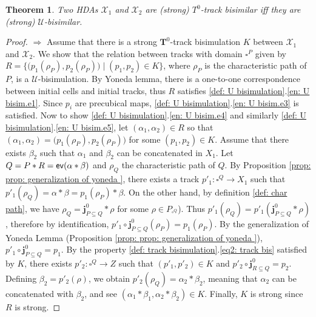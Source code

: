 \documentclass[11pt,a4paper,oldfontcommands]{memoir}
\newcommand*\ev{\textup{\textsf{ev}}}
\newcommand{\TrO}{\mathbf{T}}
\newcommand*\pobj[1]{\square^{#1}}
\newcommand*\jneda{\mathbf{j}}
\newtheorem{theorem}[definition]{Theorem}
\begin{document}
\begin{theorem}
   Two HDAs $\mathcal{X}_1$ and $\mathcal{X}_2$ are (strong) $T^0$-track bisimilar iff they are (strong) $\mathcal{U}$-bisimilar.
\end{theorem}
\begin{proof}
    $\Rightarrow$ Assume that there is a strong $\TrO^0$-track bisimulation $K$ between $\mathcal{X}_1$ and $\mathcal{X}_2$. We show that the relation between tracks with domain $\square^P$ given by $R=\{\bigl(p_1(\rho_P),p_2(\rho_P)\bigl) \mid (p_1,p_2)\in K\}$, where $\rho_P$ is the characteristic path of $P$, is a $\mathcal{U}$-bisimulation. By Yoneda lemma, there is a one-to-one correspondence between initial cells and initial tracks, thus $R$ satisfies \ref{def: U bisimulation}.\ref{en: U bisim.e1}. Since $p_i$ are precubical maps, \ref{def: U bisimulation}.\ref{en: U bisim.e3} is satisfied. Now to show \ref{def: U bisimulation}.\ref{en: U bisim.e4} and similarly \ref{def: U bisimulation}.\ref{en: U bisim.e5}, let $(\alpha_1,\alpha_2)\in R$ so that $(\alpha_1,\alpha_2)=\bigl(p_1(\rho_P),p_2(\rho_P)\bigl)$ for some $(p_1,p_2)\in K$. Assume that there exists $\beta_2$ such that $\alpha_1$ and $\beta_2$ can be concatenated in $X_1$. Let $Q=P*R=\ev(\alpha*\beta)$ and $\rho_Q$ the characteristic path of $Q$. By Proposition \ref{prop: prop: generalization of yoneda }, there exists a track $p'_1: \square^Q \to X_1$ such that $p'_1(\rho_Q)=\alpha*\beta=p_1(\rho_P)*\beta$. On the other hand, by definition \ref{def: char path}, we have $\rho_Q=\jneda^0_{P\subseteq Q}*\rho$ for some $\rho \in P_{\pobj{Q}}$). Thus $p'_1(\rho_Q)=p'_1(\jneda^0_{P\subseteq Q}*\rho)$, therefore by identification, $p'_1 \circ \jneda^0_{P\subseteq Q}(\rho_P)=p_1(\rho_P)$. By the generalization of Yoneda Lemma (Proposition \ref{prop: prop: generalization of yoneda }), $p'_1 \circ \jneda^0_{P\subseteq Q}=p_1$. By the property \ref{def: track bisimulation}.\ref{eq2: track bis} satisfied by $K$, there exists $p'_2:\square^Q \to Z$ such that $(p'_1,p'_2) \in K$ and $p'_2 \circ \jneda^0_{R\subseteq Q}=p_2$. Defining $\beta_2= p'_2(\rho)$, we obtain $p'_2(\rho_Q)=\alpha_2*\beta_2$, meaning that $\alpha_2$ can be concatenated with $\beta_2$, and see $(\alpha_1*\beta_1,\alpha_2*\beta_2) \in K$. Finally, $K$ is strong since $R$ is strong.


\end{proof}
\end{document}
